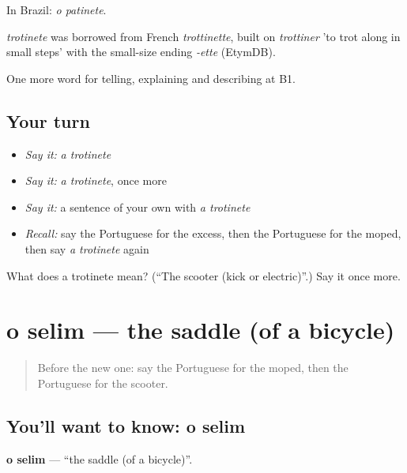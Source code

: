 In Brazil: \emph{o patinete}.

\begin{cousinweb}
\emph{trotinete} was borrowed from French \emph{trottinette}, built on \emph{trottiner} 'to trot along in small steps' with the small-size ending \emph{-ette} (EtymDB).
\end{cousinweb}

\begin{grammarlens}[title={What you've built}]
One more word for telling, explaining and describing at B1.
\end{grammarlens}

\subsection*{Your turn}
\begin{itemize}
\raggedright
  \item \emph{Say it:} \emph{a trotinete}
  \item \emph{Say it:} \emph{a trotinete}, once more
  \item \emph{Say it:} a sentence of your own with \emph{a trotinete}
  \item \emph{Recall:} say the Portuguese for the excess, then the Portuguese for the moped, then say \emph{a trotinete} again
\end{itemize}

\begin{tcolorbox}[breakable,colback=teal!4,colframe=teal!35!black,title={Before you move on}]
What does a trotinete mean? (\textquotedblleft{}The scooter (kick or electric)\textquotedblright{}.) Say it once more.
\end{tcolorbox}
\section[o selim]{o selim — the saddle (of a bicycle)}

\label{lesson:PT-C412-selim}



\begin{quote}
Before the new one: say the Portuguese for the moped, then the Portuguese for the scooter.
\end{quote}

\subsection*{You'll want to know: o selim}
\textbf{o selim} — \textquotedblleft{}the saddle (of a bicycle)\textquotedblright{}.

